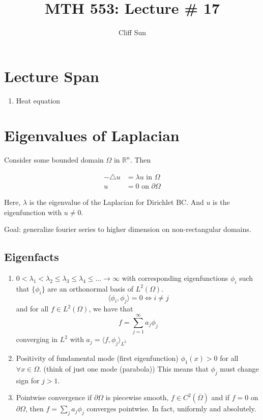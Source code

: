 \documentclass{article}
\title{MTH 553: Lecture \# 17}
\author{Cliff Sun}
\newtheorem{one minute paper}[theorem]{One Minute Paper}
\begin{document}
\maketitle

\section*{Lecture Span}
\begin{enumerate}
    \item Heat equation
\end{enumerate}

\section*{Eigenvalues of Laplacian}

Consider some bounded domain $\Omega$ in $\mathbb{R}^n$. Then 

\begin{align*}
    -\triangle u &= \lambda u \text{ in $\Omega$} \\
    u &= 0 \text{ on $\partial\Omega$}
\end{align*}

Here, $\lambda$ is the eigenvalue of the Laplacian for Dirichlet BC. And $u$ is the eigenfunction with $u \neq 0$. 

Goal: generalize fourier series to higher dimension on non-rectangular domains. 

\subsection*{Eigenfacts}

\begin{enumerate}
    \item $0 < \lambda_1 < \lambda_2 \leq \lambda_3 \leq \lambda_4 \leq \dots \rightarrow \infty$ with corresponding eigenfunctions $\phi_i$ such that $\{\phi_i\}$ are an orthonormal basis of $L^2(\Omega)$. 
    \begin{equation}
        \langle \phi_i, \phi_j \rangle = 0 \iff i \neq j
    \end{equation}
    and for all $f \in L^2(\Omega)$, we have that $$f = \sum_{j=1}^{\infty}a_j \phi_j$$ converging in $L^2$ with $a_j = \langle f, \phi_j \rangle_{L^2}$
    \item Positivity of fundamental mode (first eigenfunction) $\phi_1(x) > 0$ for all $\forall x \in \Omega$. (think of just one mode (parabola)) This means that $\phi_j$ must change sign for $j > 1$. 
    \item Pointwise convergence if $\partial \Omega$ is piecewise smooth, $f \in C^2\left( \overline{\Omega} \right)$ and if $f = 0$ on $\partial \Omega$, then $f = \sum_j a_j \phi_j$ converges pointwise. 
    In fact, uniformly and absolutely.
\end{enumerate}
\end{document}

